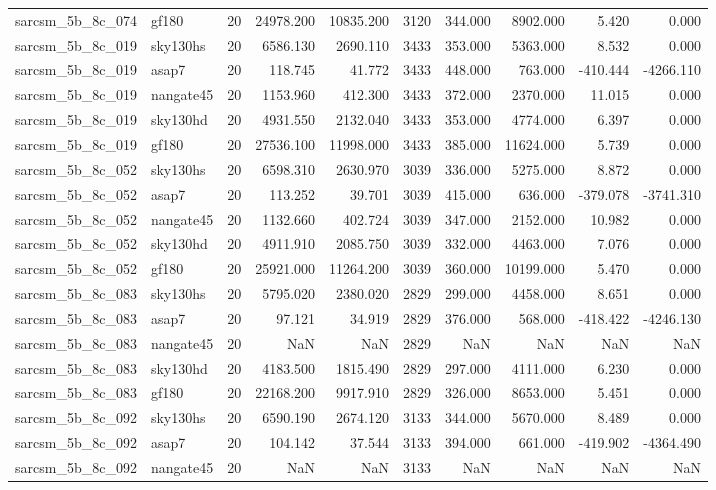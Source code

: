 \begin{tabular}{llrrrrrrrr}
sarcsm\_5b\_8c\_074 & gf180 & 20 & 24978.200 & 10835.200 & 3120 & 344.000 & 8902.000 & 5.420 & 0.000 \\
sarcsm\_5b\_8c\_019 & sky130hs & 20 & 6586.130 & 2690.110 & 3433 & 353.000 & 5363.000 & 8.532 & 0.000 \\
sarcsm\_5b\_8c\_019 & asap7 & 20 & 118.745 & 41.772 & 3433 & 448.000 & 763.000 & -410.444 & -4266.110 \\
sarcsm\_5b\_8c\_019 & nangate45 & 20 & 1153.960 & 412.300 & 3433 & 372.000 & 2370.000 & 11.015 & 0.000 \\
sarcsm\_5b\_8c\_019 & sky130hd & 20 & 4931.550 & 2132.040 & 3433 & 353.000 & 4774.000 & 6.397 & 0.000 \\
sarcsm\_5b\_8c\_019 & gf180 & 20 & 27536.100 & 11998.000 & 3433 & 385.000 & 11624.000 & 5.739 & 0.000 \\
sarcsm\_5b\_8c\_052 & sky130hs & 20 & 6598.310 & 2630.970 & 3039 & 336.000 & 5275.000 & 8.872 & 0.000 \\
sarcsm\_5b\_8c\_052 & asap7 & 20 & 113.252 & 39.701 & 3039 & 415.000 & 636.000 & -379.078 & -3741.310 \\
sarcsm\_5b\_8c\_052 & nangate45 & 20 & 1132.660 & 402.724 & 3039 & 347.000 & 2152.000 & 10.982 & 0.000 \\
sarcsm\_5b\_8c\_052 & sky130hd & 20 & 4911.910 & 2085.750 & 3039 & 332.000 & 4463.000 & 7.076 & 0.000 \\
sarcsm\_5b\_8c\_052 & gf180 & 20 & 25921.000 & 11264.200 & 3039 & 360.000 & 10199.000 & 5.470 & 0.000 \\
sarcsm\_5b\_8c\_083 & sky130hs & 20 & 5795.020 & 2380.020 & 2829 & 299.000 & 4458.000 & 8.651 & 0.000 \\
sarcsm\_5b\_8c\_083 & asap7 & 20 & 97.121 & 34.919 & 2829 & 376.000 & 568.000 & -418.422 & -4246.130 \\
sarcsm\_5b\_8c\_083 & nangate45 & 20 & NaN & NaN & 2829 & NaN & NaN & NaN & NaN \\
sarcsm\_5b\_8c\_083 & sky130hd & 20 & 4183.500 & 1815.490 & 2829 & 297.000 & 4111.000 & 6.230 & 0.000 \\
sarcsm\_5b\_8c\_083 & gf180 & 20 & 22168.200 & 9917.910 & 2829 & 326.000 & 8653.000 & 5.451 & 0.000 \\
sarcsm\_5b\_8c\_092 & sky130hs & 20 & 6590.190 & 2674.120 & 3133 & 344.000 & 5670.000 & 8.489 & 0.000 \\
sarcsm\_5b\_8c\_092 & asap7 & 20 & 104.142 & 37.544 & 3133 & 394.000 & 661.000 & -419.902 & -4364.490 \\
sarcsm\_5b\_8c\_092 & nangate45 & 20 & NaN & NaN & 3133 & NaN & NaN & NaN & NaN \\

\end{tabular}
